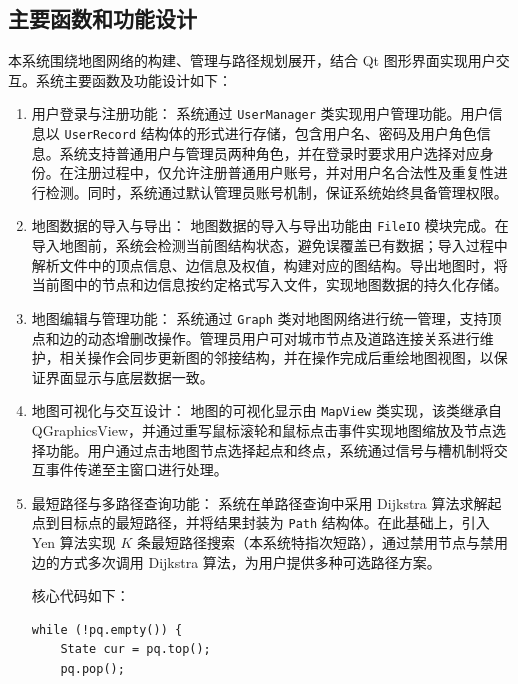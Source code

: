 \documentclass[UTF8,12pt,a4paper]{ctexart}
\begin{document}
\newpage
\subsection{主要函数和功能设计}

本系统围绕地图网络的构建、管理与路径规划展开，结合 Qt 图形界面实现用户交互。系统主要函数及功能设计如下：

\begin{enumerate}[label=（\arabic*）, leftmargin=2em, itemsep=0.6em]

  \item {\heiti 用户登录与注册功能：}
  系统通过 \texttt{UserManager} 类实现用户管理功能。用户信息以 \texttt{UserRecord} 结构体的形式进行存储，包含用户名、密码及用户角色信息。系统支持普通用户与管理员两种角色，并在登录时要求用户选择对应身份。在注册过程中，仅允许注册普通用户账号，并对用户名合法性及重复性进行检测。同时，系统通过默认管理员账号机制，保证系统始终具备管理权限。

  \item {\heiti 地图数据的导入与导出：}
  地图数据的导入与导出功能由 \texttt{FileIO} 模块完成。在导入地图前，系统会检测当前图结构状态，避免误覆盖已有数据；导入过程中解析文件中的顶点信息、边信息及权值，构建对应的图结构。导出地图时，将当前图中的节点和边信息按约定格式写入文件，实现地图数据的持久化存储。

  \item {\heiti 地图编辑与管理功能：}
  系统通过 \texttt{Graph} 类对地图网络进行统一管理，支持顶点和边的动态增删改操作。管理员用户可对城市节点及道路连接关系进行维护，相关操作会同步更新图的邻接结构，并在操作完成后重绘地图视图，以保证界面显示与底层数据一致。

  \item {\heiti 地图可视化与交互设计：}
  地图的可视化显示由 \texttt{MapView} 类实现，该类继承自 QGraphicsView，并通过重写鼠标滚轮和鼠标点击事件实现地图缩放及节点选择功能。用户通过点击地图节点选择起点和终点，系统通过信号与槽机制将交互事件传递至主窗口进行处理。

  \item {\heiti 最短路径与多路径查询功能：}
  系统在单路径查询中采用 Dijkstra 算法求解起点到目标点的最短路径，并将结果封装为 \texttt{Path} 结构体。在此基础上，引入 Yen 算法实现 $K$ 条最短路径搜索（本系统特指次短路），通过禁用节点与禁用边的方式多次调用 Dijkstra 算法，为用户提供多种可选路径方案。

核心代码如下：

\begin{lstlisting}[caption={Dijkstra 算法的主循环与松弛过程}]
while (!pq.empty()) {
    State cur = pq.top();
    pq.pop();


\end{lstlisting}
\end{enumerate}
\end{document}
